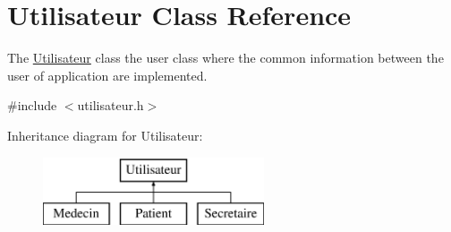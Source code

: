 \hypertarget{class_utilisateur}{}\section{Utilisateur Class Reference}
\label{class_utilisateur}


The \mbox{\hyperlink{class_utilisateur}{Utilisateur}} class the user class where the common information between the user of application are implemented.  




{\ttfamily \#include $<$utilisateur.\+h$>$}

Inheritance diagram for Utilisateur\+:\begin{figure}[H]
\begin{center}
\leavevmode
\includegraphics[height=2.000000cm]{class_utilisateur}
\end{center}
\end{figure}
